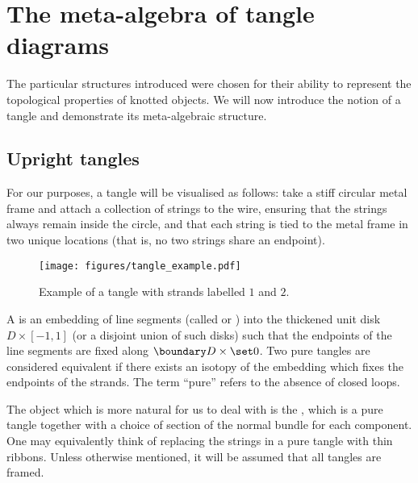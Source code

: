 \section{The meta-algebra of tangle diagrams}
\label{sec:topological_interpretations}

The particular structures introduced were chosen for their ability to represent
the topological properties of knotted objects. We will now introduce the notion
of a tangle and demonstrate its meta-algebraic structure.

\subsection{Upright tangles}

For our purposes, a tangle will be visualised as follows: take a stiff circular
metal frame and attach a collection of strings to the wire, ensuring that the
strings always remain inside the circle, and that each string is tied to the
metal frame in two unique locations (that is, no two strings share an endpoint).
\begin{figure}[h]
        \centering
        \texttt{[image: figures/tangle\_example.pdf]}
        \caption{Example of a tangle with strands labelled $1$ and $2$.}
        \label{fig:tangle_example}
\end{figure}

\begin{definition}
        A  is an embedding of line segments (called
         or ) into the thickened unit disk
        $D \times [-1,1]$ (or a disjoint union of such disks) such that the
        endpoints of the line segments are fixed along
        $\boundary D \times \set0$. Two pure tangles are considered equivalent
        if there exists an isotopy of the embedding which fixes the endpoints of
        the strands. The term \enquote{pure} refers to the absence of closed
        loops.
\end{definition}

\begin{definition}
        The object which is more natural for us to deal with is the , which is a pure tangle together with a choice of section of the
        normal bundle for each component. One may equivalently think of
        replacing the strings in a pure tangle with thin ribbons. Unless
        otherwise mentioned, it will be assumed that all tangles are framed.
\end{definition}

